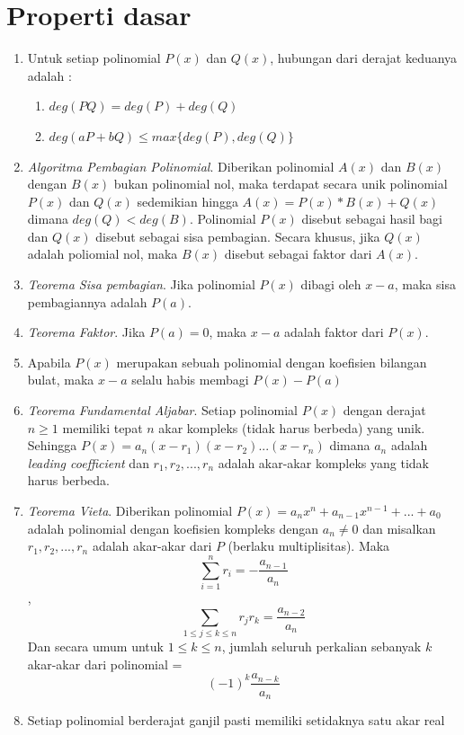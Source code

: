 \documentclass[11pt]{scrartcl}
\begin{document}
\section{Properti dasar}
\begin{enumerate}
    \item Untuk setiap polinomial $P(x)$ dan $Q(x)$, hubungan dari derajat keduanya adalah :
    \begin{enumerate}
        \item $deg(PQ) = deg(P) + deg(Q)$
        \item $deg(aP + bQ) \leq max\{deg(P),deg(Q)\}$
    \end{enumerate} 
    \item \textit{Algoritma Pembagian Polinomial}. Diberikan polinomial $A(x)$ dan $B(x)$ dengan $B(x)$ bukan polinomial nol, maka terdapat secara unik polinomial $P(x)$ dan $Q(x)$ sedemikian hingga $A(x) = P(x)*B(x) + Q(x)$ dimana $deg(Q) < deg(B)$. Polinomial $P(x)$ disebut sebagai hasil bagi dan $Q(x)$ disebut sebagai sisa pembagian. Secara khusus, jika $Q(x)$ adalah poliomial nol, maka $B(x)$ disebut sebagai faktor dari $A(x)$.
    \item \textit{Teorema Sisa pembagian}. Jika polinomial $P(x)$ dibagi oleh $x-a$, maka sisa pembagiannya adalah $P(a)$. 
    \item \textit{Teorema Faktor}. Jika $P(a) = 0$, maka $x-a$ adalah faktor dari $P(x)$.
    \item Apabila $P(x)$ merupakan sebuah polinomial dengan koefisien bilangan bulat, maka $x - a$ selalu habis membagi $P(x) - P(a)$
    \item \textit{Teorema Fundamental Aljabar}. Setiap polinomial $P(x)$ dengan derajat $n \geq 1$ memiliki tepat $n$ akar kompleks (tidak harus berbeda) yang unik. Sehingga $P(x) = a_n(x-r_1)(x-r_2)...(x-r_n)$ dimana $a_n$ adalah \textit{leading coefficient} dan $r_1,r_2,...,r_n$ adalah akar-akar kompleks yang tidak harus berbeda.
    \item \textit{Teorema Vieta}. Diberikan polinomial $P(x) = a_nx^n + a_{n-1}x^{n-1} + ... + a_0$ adalah polinomial dengan koefisien kompleks dengan $a_n \neq 0$ dan misalkan $r_1,r_2,...,r_n$ adalah akar-akar dari $P$ (berlaku multiplisitas). Maka $$\sum_{i=1}^n r_i = -\frac{a_{n-1}}{a_n}$$ , $$\sum_{1\leq j \leq k \leq n} r_jr_k = \frac{a_{n-2}}{a_n}$$
    Dan secara umum untuk $1 \leq k \leq n$, jumlah seluruh perkalian sebanyak $k$ akar-akar dari polinomial = $$(-1)^k \frac{a_{n-k}}{a_n}$$ 
    \item Setiap polinomial berderajat ganjil pasti memiliki setidaknya satu akar real

\end{enumerate}
\end{document}
